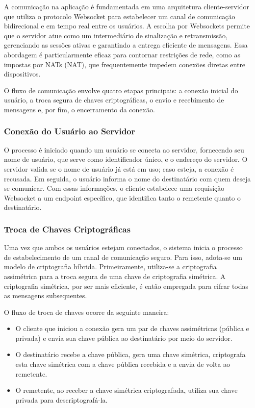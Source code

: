 A comunicação na aplicação é fundamentada em uma arquitetura
cliente-servidor que utiliza o protocolo Websocket para estabelecer
um canal de comunicação bidirecional e em tempo real entre os
usuários. A escolha por Websockets permite que o servidor atue como
um intermediário de sinalização e retransmissão, gerenciando as
sessões ativas e garantindo a entrega eficiente de mensagens. Essa
abordagem é particularmente eficaz para contornar restrições de rede,
como as impostas por \acsp{NAT} (\acl{NAT}), que frequentemente
impedem conexões diretas entre dispositivos.

O fluxo de comunicação envolve quatro etapas principais: a conexão
inicial do usuário, a troca segura de chaves criptográficas, o envio
e recebimento de mensagens e, por fim, o encerramento da conexão.

\subsubsection{Conexão do Usuário ao Servidor}

O processo é iniciado quando um usuário se conecta ao servidor,
fornecendo seu nome de usuário, que serve como identificador único, e
o endereço do servidor. O servidor valida se o nome de usuário já
está em uso; caso esteja, a conexão é recusada. Em seguida, o usuário
informa o nome do destinatário com quem deseja se comunicar. Com
essas informações, o cliente estabelece uma requisição Websocket a um
endpoint específico, que identifica tanto o remetente quanto o destinatário.

\subsubsection{Troca de Chaves Criptográficas}

Uma vez que ambos os usuários estejam conectados, o sistema inicia o
processo de estabelecimento de um canal de comunicação seguro. Para
isso, adota-se um modelo de criptografia híbrida. Primeiramente,
utiliza-se a criptografia assimétrica para a troca segura de uma
chave de criptografia simétrica. A criptografia simétrica, por ser
mais eficiente, é então empregada para cifrar todas as mensagens subsequentes.

O fluxo de troca de chaves ocorre da seguinte maneira:

\begin{itemize}
  \item O cliente que iniciou a conexão gera um par de chaves
    assimétricas (pública e privada) e envia sua chave pública ao
    destinatário por meio do servidor.
  \item O destinatário recebe a chave pública, gera uma chave
    simétrica, criptografa esta chave simétrica com a chave pública
    recebida e a envia de volta ao remetente.
  \item O remetente, ao receber a chave simétrica criptografada,
    utiliza sua chave privada para descriptografá-la.
\end{itemize}

